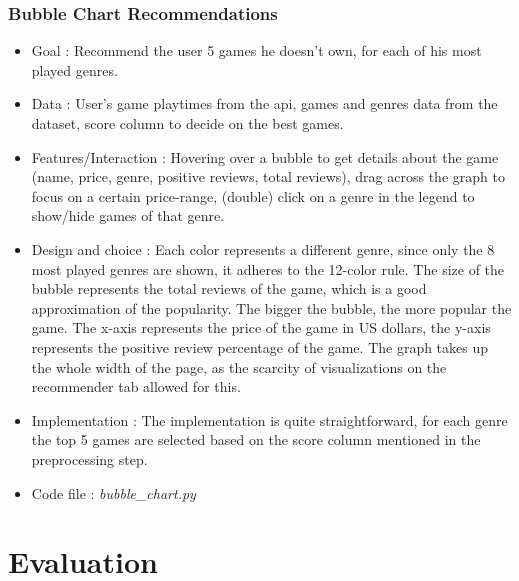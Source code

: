\documentclass{article}
\begin{document}
	\subsubsection{Bubble Chart Recommendations}
	\begin{itemize}
		\item Goal : Recommend the user 5 games he doesn't own, for each of his most played genres.
		\item Data : User's game playtimes from the api, games and genres data from the dataset, score column to decide on the best games.
		\item Features/Interaction : Hovering over a bubble to get details about the game (name, price, genre, positive reviews, total reviews), drag across the graph to focus on a certain price-range, (double) click on a genre in the legend to show/hide games of that genre. 
		\item Design and choice : Each color represents a different genre, since only the 8 most played genres are shown, it adheres to the 12-color rule. The size of the bubble represents the total reviews of the game, which is a good approximation of the popularity. The bigger the bubble, the more popular the game. The x-axis represents the price of the game in US dollars, the y-axis represents the positive review percentage of the game. The graph takes up the whole width of the page, as the scarcity of visualizations on the recommender tab allowed for this.
		\item Implementation : The implementation is quite straightforward, for each genre the top 5 games are selected based on the score column mentioned in the preprocessing step.
		\item Code file : \textit{bubble\_chart.py}
	\end{itemize}

	\section{Evaluation}
	
	\printbibliography %
\end{document}
